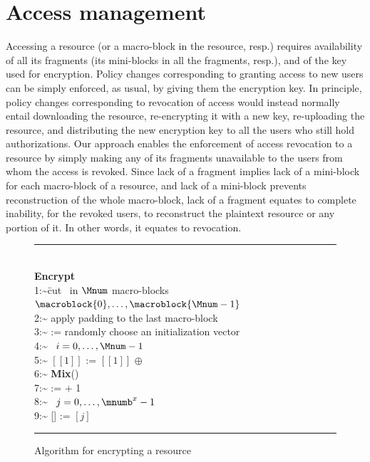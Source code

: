 \section{Access management}\label{ms:sec:revoke}

Accessing a resource (or a macro-block in the resource, resp.) requires availability of all its fragments (its mini-blocks in all the fragments, resp.), and of the key used for encryption. Policy changes corresponding to granting access to new users can be simply enforced, as usual, by giving them the encryption key. In principle, policy changes corresponding to revocation of access would instead normally entail downloading the resource, re-encrypting it with a new key, re-uploading the resource, and distributing the new encryption key to all the users who still hold authorizations. Our approach enables the enforcement of access revocation to a resource by simply making any of its fragments unavailable to the users from whom the access is revoked. Since lack of a fragment implies lack of a mini-block for each macro-block of a resource, and lack of a mini-block prevents reconstruction of the whole macro-block, lack of a fragment equates to complete inability, for the revoked users, to reconstruct the plaintext resource or any portion of it. In other words, it equates to revocation.

\begin{figure}[!t]
\begin{scriptsize}
\hrule          %
\begin{tabbing}
\hfill\\
{\bf Encrypt}\\[1em]
\num{1:~}\= cut \resource\ in $\Mnum$ macro-blocks $\macroblock{0},\ldots,\macroblock{\Mnum-1}$\\[0.3em]
\num{2:~}\1 apply padding to the last macro-block \\[0.3em]
\num{3:~}\1  := randomly choose an initialization vector\\[0.3em]
\num{4:~}\1 \myfor\ $i=0,\ldots,\Mnum-1$  \\[0.3em]
\num{5:~}\2     $[[1]]$ := $[[1]]$ $\oplus$  \\[0.3em]
\num{6:~}\2     {\bf Mix}() \\[0.3em]
\num{7:~}\2      :=  $+$ 1 \\[0.3em]
\num{8:~}\2     \myfor\ $j=0,\ldots,\mnumb^x-1$  \\[0.3em]
\num{9:~}\3         [] := $[j]$
\end{tabbing}
\hrule
\end{scriptsize}
\caption{\label{ms:fig:algoenc}Algorithm for encrypting a resource \resource}
\end{figure}


